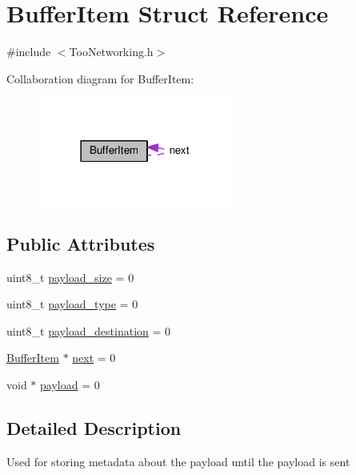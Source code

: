 \hypertarget{structBufferItem}{}\section{Buffer\+Item Struct Reference}
\label{structBufferItem}


{\ttfamily \#include $<$Too\+Networking.\+h$>$}



Collaboration diagram for Buffer\+Item\+:\nopagebreak
\begin{figure}[H]
\begin{center}
\leavevmode
\includegraphics[width=182pt]{structBufferItem__coll__graph}
\end{center}
\end{figure}
\subsection*{Public Attributes}
\begin{DoxyCompactItemize}
\item 
uint8\+\_\+t \hyperlink{structBufferItem_a5c3187c383ceec1825964d5e512273de}{payload\+\_\+size} = 0
\item 
uint8\+\_\+t \hyperlink{structBufferItem_a3d7529f54e1e8ffaa3ee3b85ae0ebbbd}{payload\+\_\+type} = 0
\item 
uint8\+\_\+t \hyperlink{structBufferItem_a2e475a18a6671f1f0c4bf3010d7a6e89}{payload\+\_\+destination} = 0
\item 
\hyperlink{structBufferItem}{Buffer\+Item} $\ast$ \hyperlink{structBufferItem_a0b7574f1fee48cbb04176af01f9d810f}{next} = 0
\item 
void $\ast$ \hyperlink{structBufferItem_a0ec6d94d7df8c1e9db526fa0200267bb}{payload} = 0
\end{DoxyCompactItemize}


\subsection{Detailed Description}
Used for storing metadata about the payload until the payload is sent 


